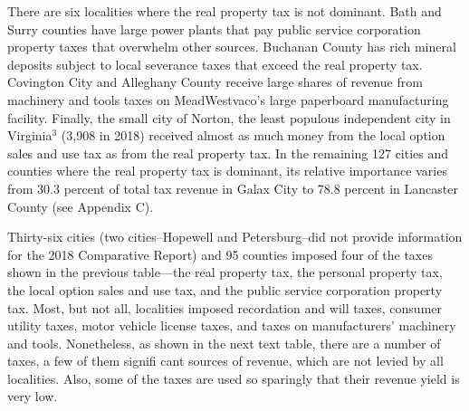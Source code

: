 \documentclass[
]{book}
\begin{document}
There are six localities where the real property tax is not dominant. Bath and Surry counties have large power plants that pay public service corporation property taxes that overwhelm other sources. Buchanan County has rich mineral deposits subject to local severance taxes that exceed the real property tax. Covington City and Alleghany County receive large shares of revenue from machinery and tools taxes on MeadWestvaco's large paperboard manufacturing facility. Finally, the small city of Norton, the least populous independent city in Virginia\(^3\) (3,908 in 2018) received almost as much money from the local option sales and use tax as from the real property tax. In the remaining 127 cities and counties where the real property tax is dominant, its relative importance varies from 30.3 percent of total tax revenue in Galax City to 78.8 percent in Lancaster County (see Appendix C).

Thirty-six cities (two cities--Hopewell and Petersburg--did not provide information for the 2018 Comparative Report) and 95 counties imposed four of the taxes shown in the previous table---the real property tax, the personal property tax, the local option sales and use tax, and the public service corporation property tax. Most, but not all, localities imposed recordation and will taxes, consumer utility taxes, motor vehicle license taxes, and taxes on manufacturers' machinery and tools. Nonetheless, as shown in the next text table, there are a number of taxes, a few of them signifi cant sources of revenue, which are not levied by all localities. Also, some of the taxes are used so sparingly that their revenue yield is very low.
\end{document}
